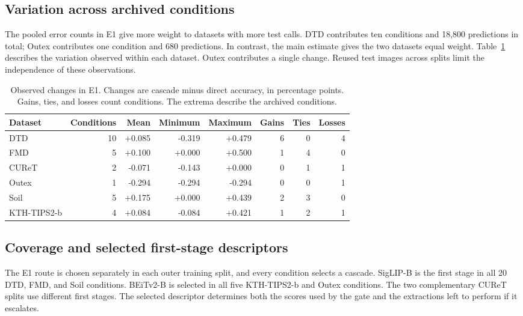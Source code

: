 \documentclass[10pt,a4paper,fleqn]{article}
\begin{document}
\subsection{Variation across archived conditions}

The pooled error counts in E1 give more weight to datasets with more test calls. DTD contributes ten conditions and 18,800 predictions in total; Outex contributes one condition and 680 predictions. In contrast, the main estimate gives the two datasets equal weight. Table~\ref{tab:e1-ranges} describes the variation observed within each dataset. Outex contributes a single change. Reused test images across splits limit the independence of these observations.

\begin{table}[htbp]
\centering
\caption{Observed changes in E1. Changes are cascade minus direct accuracy, in percentage points. Gains, ties, and losses count conditions. The extrema describe the archived conditions.}
\label{tab:e1-ranges}
\begin{tabular}{@{}lrrrrrrr@{}}
\toprule
Dataset & Conditions & Mean & Minimum & Maximum & Gains & Ties & Losses \\
\midrule
DTD & 10 & +0.085 & -0.319 & +0.479 & 6 & 0 & 4 \\
FMD & 5 & +0.100 & +0.000 & +0.500 & 1 & 4 & 0 \\
CUReT & 2 & -0.071 & -0.143 & +0.000 & 0 & 1 & 1 \\
Outex & 1 & -0.294 & -0.294 & -0.294 & 0 & 0 & 1 \\
Soil & 5 & +0.175 & +0.000 & +0.439 & 2 & 3 & 0 \\
KTH-TIPS2-b & 4 & +0.084 & -0.084 & +0.421 & 1 & 2 & 1 \\
\bottomrule
\end{tabular}
\end{table}

\subsection{Coverage and selected first-stage descriptors}

The E1 route is chosen separately in each outer training split, and every condition selects a cascade. SigLIP-B is the first stage in all 20 DTD, FMD, and Soil conditions. BEiTv2-B is selected in all five KTH-TIPS2-b and Outex conditions. The two complementary CUReT splits use different first stages. The selected descriptor determines both the scores used by the gate and the extractions left to perform if it escalates.
\end{document}
